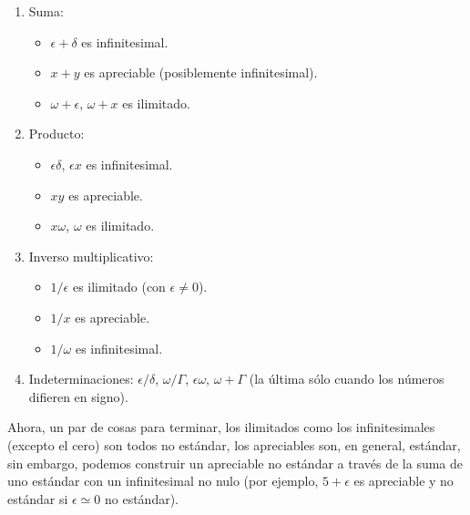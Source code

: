 \documentclass[11pt,oneside,a4paper]{book}
\begin{document}
\begin{enumerate}
\item Suma:
	\begin{itemize}
	\item $\epsilon+\delta$ es infinitesimal.
	\item $x+y$ es apreciable (posiblemente infinitesimal).
	\item $\omega+\epsilon$, $\omega+x$ es ilimitado.
	\end{itemize}
\item Producto:
	\begin{itemize}
	\item $\epsilon\delta$, $\epsilon x$ es infinitesimal.
	\item $xy$ es apreciable.
	\item $x\omega$, $\omega$ es ilimitado.
	\end{itemize}
\item Inverso multiplicativo:
	\begin{itemize}
	\item $1/\epsilon$ es ilimitado (con $\epsilon\neq 0$).
	\item $1/x$ es apreciable.
	\item $1/\omega$ es infinitesimal.
	\end{itemize}
\item Indeterminaciones: $\epsilon/\delta$, $\omega/\Gamma$, $\epsilon\omega$, $\omega+\Gamma$ (la última sólo cuando los números difieren en signo).
\end{enumerate}

Ahora, un par de cosas para terminar, los ilimitados como los infinitesimales (excepto el cero) son todos no estándar, los apreciables son, en general, estándar, sin embargo, podemos construir un apreciable no estándar a través de la suma de uno estándar con un infinitesimal no nulo (por ejemplo, $5+\epsilon$ es apreciable y no estándar si $\epsilon\simeq 0$ no estándar).
\end{document}
